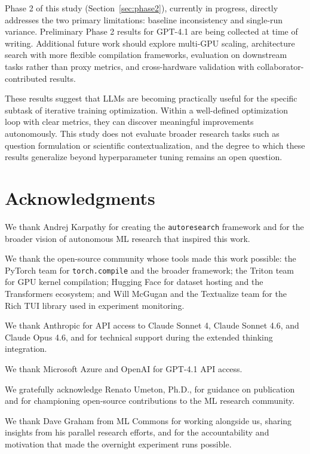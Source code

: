 \documentclass[11pt]{article}
\begin{document}
Phase 2 of this study (Section~\ref{sec:phase2}), currently in progress, directly addresses the two primary limitations: baseline inconsistency and single-run variance. Preliminary Phase 2 results for GPT-4.1 are being collected at time of writing. Additional future work should explore multi-GPU scaling, architecture search with more flexible compilation frameworks, evaluation on downstream tasks rather than proxy metrics, and cross-hardware validation with collaborator-contributed results.

These results suggest that LLMs are becoming practically useful for the specific subtask of iterative training optimization. Within a well-defined optimization loop with clear metrics, they can discover meaningful improvements autonomously. This study does not evaluate broader research tasks such as question formulation or scientific contextualization, and the degree to which these results generalize beyond hyperparameter tuning remains an open question.

\section*{Acknowledgments}
\label{sec:acknowledgments}

We thank Andrej Karpathy for creating the \texttt{autoresearch} framework and for the broader vision of autonomous ML research that inspired this work.

We thank the open-source community whose tools made this work possible: the PyTorch team for \texttt{torch.compile} and the broader framework; the Triton team for GPU kernel compilation; Hugging Face for dataset hosting and the Transformers ecosystem; and Will McGugan and the Textualize team for the Rich TUI library used in experiment monitoring.

We thank Anthropic for API access to Claude Sonnet 4, Claude Sonnet 4.6, and Claude Opus 4.6, and for technical support during the extended thinking integration.

We thank Microsoft Azure and OpenAI for GPT-4.1 API access.

We gratefully acknowledge Renato Umeton, Ph.D., for guidance on publication and for championing open-source contributions to the ML research community.

We thank Dave Graham from ML Commons for working alongside us, sharing insights from his parallel research efforts, and for the accountability and motivation that made the overnight experiment runs possible.
\end{document}
